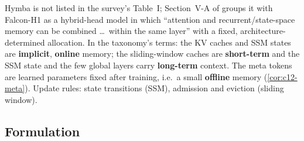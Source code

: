 \begin{taxonomy}
Hymba is not listed in the survey's Table~I; Section~V-A of \citet{zhoubian2026memory} groups it
with Falcon-H1 as a hybrid-head model in which ``attention and recurrent/state-space memory can
be combined \dots\ within the same layer'' with a fixed, architecture-determined allocation. In
the taxonomy's terms: the KV caches and SSM states are \textbf{implicit}, \textbf{online} memory;
the sliding-window caches are \textbf{short-term} and the SSM state and the few global layers
carry \textbf{long-term} context. The meta tokens are learned parameters fixed after training,
i.e.\ a small \textbf{offline} memory (\cref{cor:c12-meta}). Update rules: state transitions
(SSM), admission and eviction (sliding window).
\end{taxonomy}

\subsection{Formulation}

